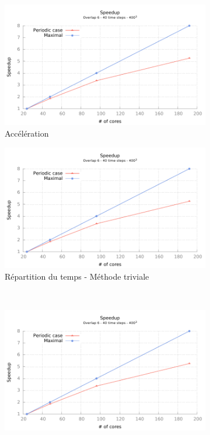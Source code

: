 \begin{figure}[!ht]
  \centering
  \begin{subfigure}[b]{0.5\textwidth}
    \centering
    \includegraphics[page=2,scale=0.51]{gnuplot/bench_strong_nemo.pdf}
    \caption{\label{fig:strong_aper}Accélération}
  \end{subfigure}
  \begin{subfigure}[b]{0.5\textwidth}
    \centering
    \includegraphics[page=4,scale=0.7]{gnuplot/bench_strong_nemo.pdf}
    \caption{\label{fig:strong_aper_triv}Répartition du temps - Méthode triviale}
  \end{subfigure}%
  ~
  \begin{subfigure}[b]{0.5\textwidth}
    \centering
    \includegraphics[page=5,scale=0.7]{gnuplot/bench_strong_nemo.pdf}

\end{subfigure}
\end{figure}
